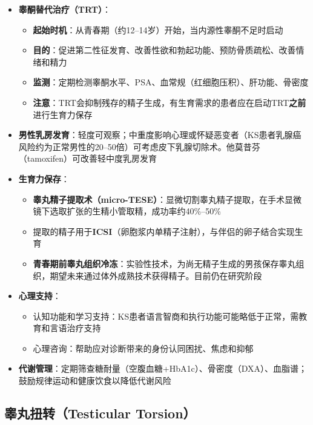 \begin{itemize}[leftmargin=2cm]
	\item \textbf{睾酮替代治疗（TRT）}：
	\begin{itemize}
		\item \textbf{起始时机}：从青春期（约12--14岁）开始，当内源性睾酮不足时启动
		\item \textbf{目的}：促进第二性征发育、改善性欲和勃起功能、预防骨质疏松、改善情绪和精力
		\item \textbf{监测}：定期检测睾酮水平、PSA、血常规（红细胞压积）、肝功能、骨密度
		\item \textbf{注意}：TRT会抑制残存的精子生成，有生育需求的患者应在启动TRT\textbf{之前}进行生育力保存
	\end{itemize}

	\item \textbf{男性乳房发育}：轻度可观察；中重度影响心理或怀疑恶变者（KS患者乳腺癌风险约为正常男性的20--50倍）可考虑皮下乳腺切除术。他莫昔芬（tamoxifen）可改善轻中度乳房发育

	\item \textbf{生育力保存}：
	\begin{itemize}
		\item \textbf{睾丸精子提取术（micro-TESE）}：显微切割睾丸精子提取，在手术显微镜下选取扩张的生精小管取精，成功率约40\%--50\%
		\item 提取的精子用于\textbf{ICSI}（卵胞浆内单精子注射），与伴侣的卵子结合实现生育
		\item \textbf{青春期前睾丸组织冷冻}：实验性技术，为尚无精子生成的男孩保存睾丸组织，期望未来通过体外成熟技术获得精子。目前仍在研究阶段
	\end{itemize}

	\item \textbf{心理支持}：
	\begin{itemize}
		\item 认知功能和学习支持：KS患者语言智商和执行功能可能略低于正常，需教育和言语治疗支持
		\item 心理咨询：帮助应对诊断带来的身份认同困扰、焦虑和抑郁
	\end{itemize}

	\item \textbf{代谢管理}：定期筛查糖耐量（空腹血糖+HbA1c）、骨密度（DXA）、血脂谱；鼓励规律运动和健康饮食以降低代谢风险
\end{itemize}

\subsection{睾丸扭转（Testicular Torsion）}
\label{subsec:testicular_torsion}

